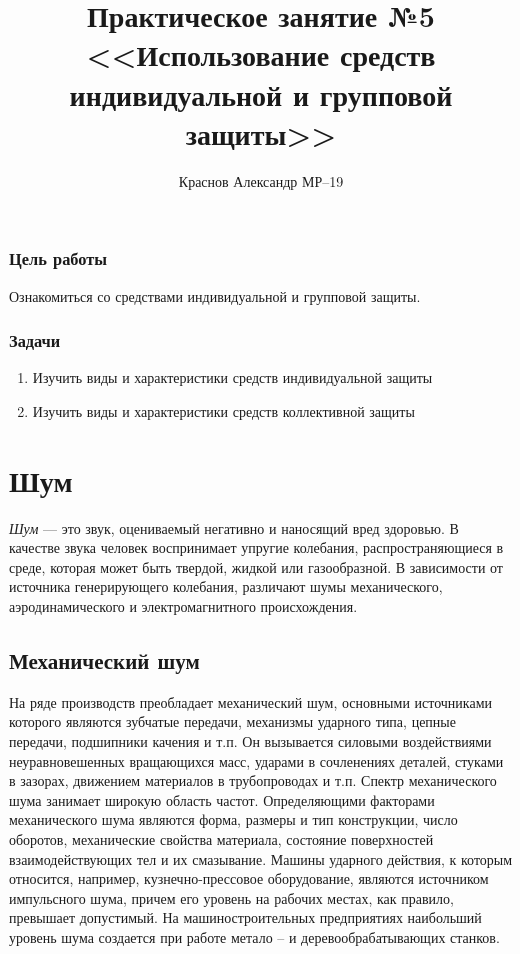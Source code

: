 \documentclass[a5paper, 12dd, twoside]{article}
\title{Практическое занятие №5\\<<Использование средств индивидуальной и групповой защиты>>}
\author{Краснов Александр МР--19}
\begin{document}
\maketitle
\tableofcontents
\clearpage

\subsubsection*{Цель работы}
Ознакомиться со средствами индивидуальной и групповой защиты.

\subsubsection*{Задачи}
\begin{enumerate}
    \item Изучить виды и характеристики средств индивидуальной защиты
    \item Изучить виды и характеристики средств коллективной защиты
\end{enumerate}

\section{Шум}
{\itshape Шум} --- это звук, оцениваемый негативно и наносящий\- вред здоровью. 
В качестве звука человек воспринимает упругие колебания, распространяющиеся в среде, которая может быть твердой, жидкой или газообразной. В зависимости от источника генерирующего колебания, различают шумы механического, аэродинамического и электромагнитного происхождения.

\subsection{Механический шум}
На ряде производств преобладает механический шум, основными источниками которого являются зубчатые передачи, механизмы ударного типа, цепные передачи, подшипники качения и т.п. Он вызывается силовыми воздействиями неуравновешенных вращающихся масс, ударами в сочленениях деталей, стуками в зазорах, движением материалов в трубопроводах и т.п. Спектр механического шума занимает широкую область частот. Определяющими факторами механического шума являются форма, размеры и тип конструкции, число оборотов, механические свойства материала, состояние поверхностей взаимодействующих тел и их смазывание. Машины ударного действия, к которым относится, например, кузнечно-прессовое оборудование, являются источником импульсного шума, причем его уровень на рабочих местах, как правило, превышает допустимый. На машиностроительных предприятиях наибольший уровень шума создается при работе метало -- и деревообрабатывающих станков. 
\end{document}
